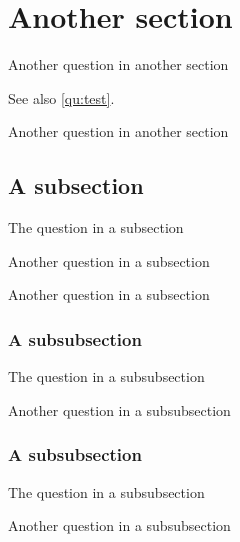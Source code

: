 \documentclass{article}
\newcounter{question}
\begin{document}
    \section{Another section}

    \begin{question}
        Another question in another section
    \end{question}

    See also \ref{qu:test}.

    \begin{question}
        Another question in another section
    \end{question}

    \subsection{A subsection}

    \begin{question}
        The question in a subsection
    \end{question}

    \begin{question}
        Another question in a subsection
    \end{question}

    \begin{question}
        Another question in a subsection
    \end{question}

    \subsubsection{A subsubsection}

    \begin{question}
        The question in a subsubsection
    \end{question}

    \begin{question}
        Another question in a subsubsection
    \end{question}

    \subsubsection{A subsubsection}

    \begin{question}
        The question in a subsubsection
    \end{question}

    \begin{question}
        Another question in a subsubsection
    \end{question}

    
\end{document}
